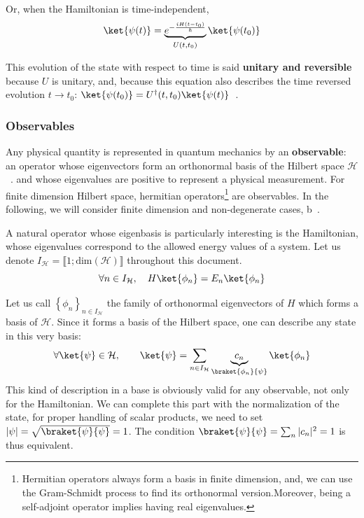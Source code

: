 Or, when the Hamiltonian is time-independent, %
\begin{equation}
    \ket{\psi(t)} = \underbrace{e^{-\frac{iH(t-t_0)}{\hbar}}}_{U(t,t_0)}\ket{\psi(t_0)}
\end{equation} 

This evolution of the state with respect to time is said \textbf{unitary and reversible} because $U$ is unitary, and, because this equation also describes the time reversed evolution $t\rightarrow t_0$: $\ket{\psi(t_0)}=U^\dagger(t,t_0)\ket{\psi(t)}$~. %
 
\subsubsection{Observables}
Any physical quantity is represented in quantum mechanics by an \textbf{observable}: an operator whose eigenvectors form an orthonormal basis of the Hilbert space $\mathcal{H}$~\cite{CT}. %
and whose eigenvalues are positive to represent a physical measurement. 
For finite dimension Hilbert space, hermitian operators\footnote{Hermitian operators always form a basis in finite dimension, and, we can use the Gram-Schmidt process to find its orthonormal version.Moreover, being a self-adjoint operator implies having real eigenvalues.} are observables. In the following, we will consider finite dimension and non-degenerate cases, b~\cite{CT}.\par %
A natural operator whose eigenbasis is particularly interesting is the Hamiltonian, whose eigenvalues correspond to the allowed energy values of a system. Let us denote $I_\mathcal{H}=\llbracket 1;\text{dim}(\mathcal{H})\rrbracket$ throughout this document.
\begin{equation}
    \forall n \in I_\mathcal{H},\quad H\ket{\phi_n} = E_n\ket{\phi_n} \label{EqPropreH}
\end{equation}
\par Let us call ${\left\{ \phi_n\right\}}_{n\in I_\mathcal{H}}$ the family of orthonormal eigenvectors of $H$ which forms a basis of $\mathcal{H}$.%
Since it forms a basis of the Hilbert space, one can describe any state in this very basis:
\begin{equation}
    \forall\ket{\psi}\in\mathcal{H},\qquad \ket{\psi} = \sum_{n\in I_\mathcal{H}} \underbrace{c_n}_{\braket{\phi_n}{\psi}}\ket{\phi_n}
\end{equation}
This kind of description in a base is obviously valid for any observable, not only for the Hamiltonian. We can complete this part with the normalization of the state, for proper handling of scalar products, we need to set $\left|\psi\right|=\sqrt{\braket{\psi}{\psi}}=1$. The condition $\braket{\psi}{\psi}=\sum_n |c_n|^2=1$ is thus equivalent.


